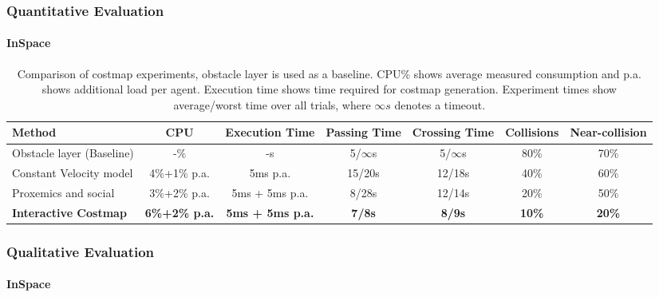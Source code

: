\begin{frame}
	\frametitle{Quantitative Evaluation}
	\framesubtitle{InSpace}
	
	\begin{table}
	\centering
	\caption{Comparison of costmap experiments, obstacle layer is used as a baseline. CPU\% shows
			 average measured consumption and p.a. shows additional load per agent. Execution time shows
			 time required for costmap generation. Experiment times show average/worst time over all
			 trials, where $\infty s$ denotes a timeout.}
	\def\arraystretch{1.3}
	\vspace{-0.3cm}
	\resizebox{\textwidth}{!}
	{
		\begin{tabular}{lcccccc}
Method & CPU & Execution Time & Passing Time & Crossing Time & Collisions & Near-collision \\ 
\hline
Obstacle layer (Baseline) & -\% & -s & 5/$\infty$s & 5/$\infty$s & 80\% & 70\%  \\
Constant Velocity model & 4\%+1\% p.a. & 5ms p.a. & 15/20s & 12/18s & 40\% & 60\%  \\
Proxemics and social & 3\%+2\% p.a. & 5ms + 5ms p.a. & 8/28s & 12/14s & 20\% &  50\%  \\
\textbf{Interactive Costmap} & \textbf{6\%+2\% p.a.} & \textbf{5ms + 5ms p.a.} & \textbf{7/8s} & \textbf{8/9s} & \textbf{10\%} &  \textbf{20\%}  \\
		\end{tabular}
	}
\end{table}
\end{frame}

\begin{frame}
	\frametitle{Qualitative Evaluation}
	\framesubtitle{InSpace}
	
	\begin{figure}[!h]
		\centering
	\end{figure}
\end{frame}
